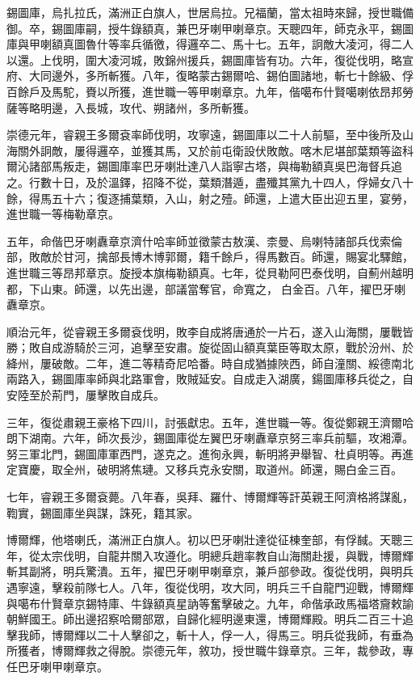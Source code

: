 \begin{pinyinscope}
錫圖庫，烏扎拉氏，滿洲正白旗人，世居烏拉。兄福蘭，當太祖時來歸，授世職備御。卒，錫圖庫嗣，授牛錄額真，兼巴牙喇甲喇章京。天聰四年，師克永平，錫圖庫與甲喇額真圖魯什等率兵循徼，得邏卒二、馬十七。五年，詗敵大凌河，得二人以還。上伐明，圍大凌河城，敗錦州援兵，錫圖庫皆有功。六年，復從伐明，略宣府、大同邊外，多所斬獲。八年，復略蒙古錫爾哈、錫伯圖諸地，斬七十餘級、俘百餘戶及馬駝，賚以所獲，進世職一等甲喇章京。九年，偕噶布什賢噶喇依昂邦勞薩等略明邊，入長城，攻代、朔諸州，多所斬獲。

崇德元年，睿親王多爾袞率師伐明，攻寧遠，錫圖庫以二十人前驅，至中後所及山海關外詗敵，屢得邏卒，並獲其馬，又於前屯衛設伏敗敵。喀木尼堪部葉類等盜科爾沁諸部馬叛走，錫圖庫率巴牙喇壯達八人詣寧古塔，與梅勒額真吳巴海督兵追之。行數十日，及於溫鐸，招降不從，葉類潛遁，盡殲其黨九十四人，俘婦女八十餘，得馬五十六；復逐捕葉類，入山，射之殪。師還，上遣大臣出迎五里，宴勞，進世職一等梅勒章京。

五年，命偕巴牙喇纛章京濟什哈率師並徵蒙古敖漢、柰曼、烏喇特諸部兵伐索倫部，敗敵於甘河，擒部長博木博郭爾，籍千餘戶，得馬數百。師還，賜宴北驛館，進世職三等昂邦章京。旋授本旗梅勒額真。七年，從貝勒阿巴泰伐明，自薊州越明都，下山東。師還，以先出邊，部議當奪官，命寬之，白金百。八年，擢巴牙喇纛章京。

順治元年，從睿親王多爾袞伐明，敗李自成將唐通於一片石，遂入山海關，屢戰皆勝；敗自成游騎於三河，追擊至安肅。旋從固山額真葉臣等取太原，戰於汾州、於絳州，屢破敵。二年，進二等精奇尼哈番。時自成猶據陜西，師自潼關、綏德南北兩路入，錫圖庫率師與北路軍會，敗賊延安。自成走入湖廣，鍚圖庫移兵從之，自安陸至於荊門，屢擊敗自成兵。

三年，復從肅親王豪格下四川，討張獻忠。五年，進世職一等。復從鄭親王濟爾哈朗下湖南。六年，師次長沙，錫圖庫從左翼巴牙喇纛章京努三率兵前驅，攻湘潭。努三軍北門，錫圖庫軍西門，遂克之。進徇永興，斬明將尹舉智、杜貞明等。再進定寶慶，取全州，破明將焦璉。又移兵克永安關，取道州。師還，賜白金三百。

七年，睿親王多爾袞薨。八年春，吳拜、羅什、博爾輝等訐英親王阿濟格將謀亂，鞫實，錫圖庫坐與謀，誅死，籍其家。

博爾輝，他塔喇氏，滿洲正白旗人。初以巴牙喇壯達從征棟奎部，有俘馘。天聰三年，從太宗伐明，自龍井關入攻遵化。明總兵趙率教自山海關赴援，與戰，博爾輝斬其副將，明兵驚潰。五年，擢巴牙喇甲喇章京，兼戶部參政。復從伐明，與明兵遇寧遠，擊殺前隊七人。八年，復從伐明，攻大同，明兵三千自龍門迎戰，博爾輝與噶布什賢章京錫特庫、牛錄額真星訥等奮擊破之。九年，命偕承政馬福塔齎敕諭朝鮮國王。師出邊招察哈爾部眾，自歸化經明邊東還，博爾輝殿。明兵二百三十追擊我師，博爾輝以二十人擊卻之，斬十人，俘一人，得馬三。明兵從我師，有垂為所獲者，博爾輝救之得脫。崇德元年，敘功，授世職牛錄章京。三年，裁參政，專任巴牙喇甲喇章京。


\end{pinyinscope}
